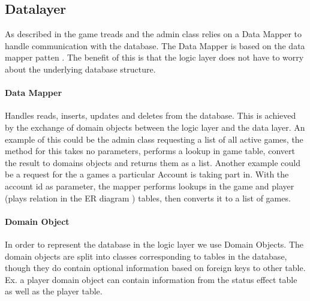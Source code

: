 \subsection{Datalayer}
\label{chap:dbImplementation}
As described in  the game treads and the admin class relies on a Data Mapper to handle communication with the database. The Data Mapper is based on the data mapper patten . The benefit of this is that the logic layer does not have to worry about the underlying database structure.
 
\paragraph{Data Mapper}
Handles reads, inserts, updates and deletes from the database. This is achieved by the exchange of domain objects between the logic layer and the data layer.
An example of this could be the admin class requesting a list of all active games, the method for this takes no parameters, performs a lookup in game table, convert the result to domains objects and returns them as a list.
Another example could be a request for the a games a particular Account is taking part in. With the account id as parameter, the mapper performs lookups in the game and player (plays relation in the ER diagram ) tables, then converts it to a list of games.


\paragraph{Domain Object} 
In order to represent the database in the logic layer we use Domain Objects. The domain objects are split into classes corresponding to tables in the database, though they do contain optional information based on foreign keys to other table. Ex. a player domain object can contain information from the status effect table as well as the player table.
